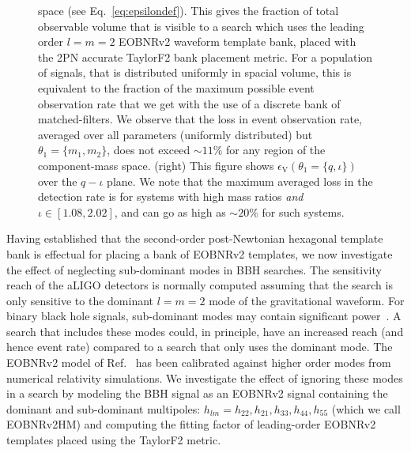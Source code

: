 \begin{figure}
{space (see Eq.~\ref{eq:epsilondef}). 
This gives the 
fraction of total observable volume that is visible to a search which uses the
leading order $l=m=2$ EOBNRv2 waveform template bank, placed with the 2PN 
accurate TaylorF2 bank placement metric. For a population of signals, that is distributed uniformly in spacial volume,
this is equivalent to the fraction of the maximum possible event observation rate that we get with the use of a discrete bank of matched-filters. We observe that the loss in event observation rate,
averaged over all parameters (uniformly distributed) but $\theta_1=\{m_1,m_2\}$,
does not exceed $\sim 11\%$ for any region of the component-mass space.
(right) This figure shows $\epsilon_{\mathrm{V}}\left(\theta_1=\{q,\iota\}\right)$ over the $q-\iota$ plane. We note that the 
maximum averaged loss in the detection rate is for systems
with high mass ratios \textit{and} $\iota\in[1.08,2.02]$, and 
can go as high as $\sim 20\%$ for such systems.
} 
\end{figure}

Having established that the second-order post-Newtonian hexagonal template
bank is effectual for placing a bank of EOBNRv2 templates, we now investigate
the effect of neglecting sub-dominant modes in BBH searches. The sensitivity
reach of the aLIGO detectors is normally computed assuming that the search is
only sensitive to the dominant $l=m=2$ mode of the gravitational waveform. For
binary black hole signals, sub-dominant modes may contain significant
power~\cite{Pekowsky:2012sr}. A search that includes these modes could, in
principle, have an increased reach (and hence event rate) compared to a search
that only uses the dominant mode. The EOBNRv2 model of
Ref.~\citep{BuonannoEOBv2Main} has been calibrated against higher order modes
from numerical relativity simulations. We investigate the effect of ignoring
these modes in a search by modeling the BBH signal as an EOBNRv2 signal
containing the dominant and sub-dominant multipoles: $h_{lm} =
h_{22},h_{21},h_{33},h_{44}, h_{55}$ (which we call EOBNRv2HM) and computing
the fitting factor of leading-order EOBNRv2 templates placed using the
TaylorF2 metric.

